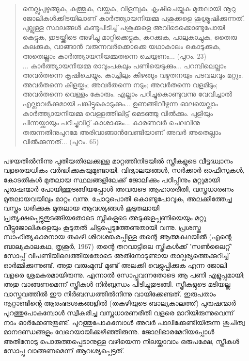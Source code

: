 \begin{quotation}
നെല്ലുപുഴുങ്ങുക, കുത്തുക, വയ്ക്കുക, വിളമ്പുക, കൃഷിചെയ്യുക മുതലായി നൂറു ജോലികൾക്കിടയിലാണ് കാർത്ത്യായനിയമ്മ പശുക്കളെ ശുശ്രൂഷിക്കുന്നത്. പുല്ലുള്ള സ്ഥലങ്ങൾ കണ്ടുപിടിച്ച് പശുക്കളെ അവിടെക്കൊണ്ടുപോയി കെട്ടുക, ഇടയ്ക്കിടെ അഴിച്ചു മാറ്റിക്കെട്ടുക, കറക്കുക, പാലുകാച്ചുക, തൈരു കലക്കുക, വാങ്ങാൻ വരുന്നവർക്കൊക്കെ യഥാകാലം കൊടുക്കുക, അതെല്ലാം കാർത്ത്യായനിയമ്മതന്നെ ചെയ്യണം... (പുറം. 23)\\

... കാർത്ത്യായനിയമ്മ രാവുംപകലും പണിയെടുക്കും... പറമ്പിലെല്ലാം അവർതന്നെ കൃഷിചെയ്യും. കാച്ചിലും കിഴങ്ങും വഴുതനയും പടവലവും മറ്റും. അവർതന്നെ കിളയ്ക്കും; അവർതന്നെ നടും; അവർതന്നെ വളമിടും; അവർതന്നെ വെള്ളം കോരും. എല്ലാം പറിച്ചുകൊണ്ടുവന്നു വേവിച്ചാൽ എല്ലാവർക്കുമായി പങ്കിട്ടുകൊടുക്കും... ഉണങ്ങിവീഴുന്ന ഓലയെല്ലാം കാർത്ത്യായനിയമ്മ വെള്ളത്തിലിട്ട് മെടഞ്ഞു വിൽക്കും. പുളിയും പിന്നയ്ക്കായും പറിച്ചുവിറ്റ് കാശാക്കും... കാരണവർ ചെലവിനു തരുന്നതിനുപുറമേ അരിവാങ്ങാൻവേണ്ടിയാണ് അവർ അതെല്ലാം വിൽക്കുന്നത്... (പുറം. 65)

\end{quotation}

\paragraph{}പഴയതിൽനിന്നു പുതിയതിലേക്കുള്ള മാറ്റത്തിനിടയിൽ സ്ത്രീകളുടെ വീട്ടദ്ധ്വാനം വളരെയധികം വർദ്ധിക്കുകയുമുണ്ടായി. വിദ്യാലയങ്ങൾ, സർക്കാർ ഓഫീസുകൾ, കോടതികൾ മുതലായ സ്ഥലങ്ങളിലേക്ക് ജോലിക്കും പഠിപ്പിനും മറ്റുമായി പുരുഷന്മാർ പോയിത്തുടങ്ങിയപ്പോൾ അവരുടെ ആഹാരരീതി, വസ്ത്രധാരണം മുതലായവയിലും മാറ്റം വന്നു. ചോറുപൊതി കൊണ്ടുപോവുക, അലക്കിത്തേച്ച വസ്ത്രം ധരിക്കുക മുതലായ ആവശ്യങ്ങൾ കൂടുതലായി പ്രത്യക്ഷപ്പെട്ടുതുടങ്ങിയതോടെ സ്ത്രീകളുടെ അടുക്കളപ്പണിയെയും മറ്റു വീട്ടുജോലികളെയും കൂടുതൽ ചിട്ടപ്പെടുത്തേണ്ടതായി വന്നു. പ്രശസ്ത സാഹിത്യകാരനായ തകഴി ശിവശങ്കരപ്പിള്ള തന്റെ ആത്മകഥയിൽ (എന്റെ ബാല്യകാലകഥ, തൃശൂർ, 1967) തന്റെ തറവാട്ടിലെ സ്ത്രീകൾക്ക് 'സൺലൈറ്റ്' സോപ്പ് വിപണിയിലെത്തിയതോടെ അതിനോടുണ്ടായ താല്പര്യത്തെക്കുറിച്ച് ഓർമ്മിക്കുന്നുണ്ട്. അതു വരുംമുമ്പ് മുണ്ട് അലക്കി വെളുപ്പിക്കുക എന്ന ജോലി വളരെ ശ്രമകരമായിരുന്നു. എന്നാൽ സോപ്പുവന്നതോടെ ആ പണി എളുപ്പമായി; അതു വാങ്ങണമെന്ന് സ്ത്രീകൾ നിർബ്ബന്ധം പിടിച്ചുതുടങ്ങി. സ്ത്രീകളുടെ മടിയല്ല വാസ്തവത്തിൽ ഈ നിർബന്ധത്തിൽനിന്നു വായിക്കേണ്ടത്. ഇരുപതാം നൂറ്റാണ്ടിന്റെ ആരംഭദശകങ്ങളിൽ (തകഴിയുടെ ബാല്യകാലത്ത്) പുരുഷന്മാർ പുറത്തുപോകുമ്പോൾ സ്വീകരിച്ച വസ്ത്രധാരണരീതി വളരെ മാറിയിരുന്നുവെന്ന് നാം ഓർക്കേണ്ടതുണ്ട്. പുറത്തുപോകുമ്പോൾ അവർ പാലിക്കേണ്ടിയിരുന്ന ശുചിത്വ മാനദണ്ഡങ്ങളും വേറെയായിക്കഴിഞ്ഞിരുന്നു. ജോലിഭാരമേറിയപ്പോൾ അതിനോടു പൊരുത്തപ്പെടാനുള്ള വഴിയെന്ന നിലയ്ക്കാവാം ഒരുപക്ഷേ, സ്ത്രീകൾ സോപ്പു വാങ്ങണമെന്ന് ആവശ്യപ്പെട്ടത്.

